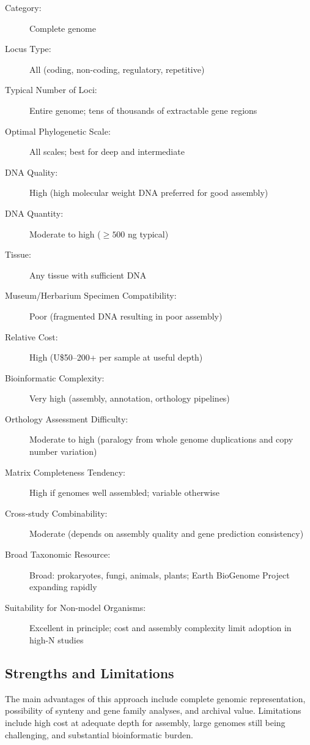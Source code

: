 \begin{description}
\item[Category:] Complete genome
\item[Locus Type:] All (coding, non-coding, regulatory, repetitive)
\item[Typical Number of Loci:] Entire genome; tens of thousands of extractable gene regions
\item[Optimal Phylogenetic Scale:] All scales; best for deep and intermediate
\item[DNA Quality:] High (high molecular weight DNA preferred for good assembly)
\item[DNA Quantity:] Moderate to high (\(\geq 500\) ng typical)
\item[Tissue:] Any tissue with sufficient DNA
\item[Museum/Herbarium Specimen Compatibility:] Poor (fragmented DNA resulting in poor assembly)
\item[Relative Cost:] High (U\$50--200+ per sample at useful depth)
\item[Bioinformatic Complexity:] Very high (assembly, annotation, orthology pipelines)
\item[Orthology Assessment Difficulty:] Moderate to high (paralogy from whole genome duplications and copy number variation)
\item[Matrix Completeness Tendency:] High if genomes well assembled; variable otherwise
\item[Cross-study Combinability:] Moderate (depends on assembly quality and gene prediction consistency)
\item[Broad Taxonomic Resource:] Broad: prokaryotes, fungi, animals, plants; Earth BioGenome Project expanding rapidly
\item[Suitability for Non-model Organisms:] Excellent in principle; cost and assembly complexity limit adoption in high-N studies
\end{description}

\subsection{Strengths and Limitations}

The main advantages of this approach include complete genomic representation, possibility of synteny and gene family analyses, and archival value. Limitations include high cost at adequate depth for assembly, large genomes still being challenging, and substantial bioinformatic burden.


